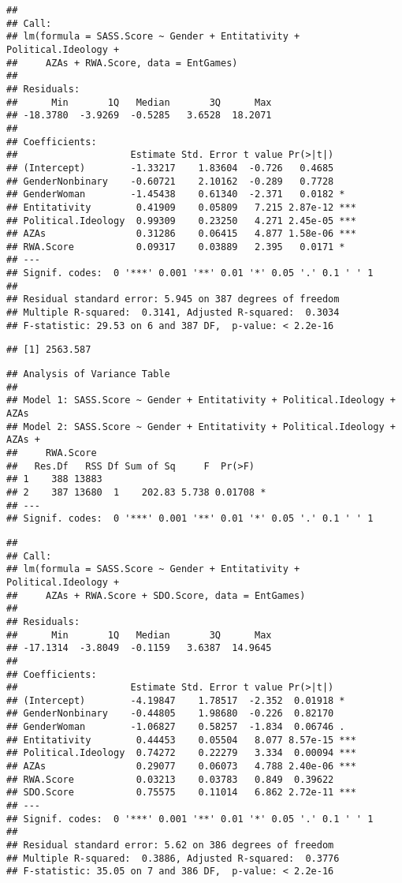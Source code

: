 \documentclass[
  doc,draftall]{apa6}
\begin{document}
\begin{verbatim}
## 
## Call:
## lm(formula = SASS.Score ~ Gender + Entitativity + Political.Ideology + 
##     AZAs + RWA.Score, data = EntGames)
## 
## Residuals:
##      Min       1Q   Median       3Q      Max 
## -18.3780  -3.9269  -0.5285   3.6528  18.2071 
## 
## Coefficients:
##                    Estimate Std. Error t value Pr(>|t|)    
## (Intercept)        -1.33217    1.83604  -0.726   0.4685    
## GenderNonbinary    -0.60721    2.10162  -0.289   0.7728    
## GenderWoman        -1.45438    0.61340  -2.371   0.0182 *  
## Entitativity        0.41909    0.05809   7.215 2.87e-12 ***
## Political.Ideology  0.99309    0.23250   4.271 2.45e-05 ***
## AZAs                0.31286    0.06415   4.877 1.58e-06 ***
## RWA.Score           0.09317    0.03889   2.395   0.0171 *  
## ---
## Signif. codes:  0 '***' 0.001 '**' 0.01 '*' 0.05 '.' 0.1 ' ' 1
## 
## Residual standard error: 5.945 on 387 degrees of freedom
## Multiple R-squared:  0.3141, Adjusted R-squared:  0.3034 
## F-statistic: 29.53 on 6 and 387 DF,  p-value: < 2.2e-16
\end{verbatim}

\begin{verbatim}
## [1] 2563.587
\end{verbatim}

\begin{verbatim}
## Analysis of Variance Table
## 
## Model 1: SASS.Score ~ Gender + Entitativity + Political.Ideology + AZAs
## Model 2: SASS.Score ~ Gender + Entitativity + Political.Ideology + AZAs + 
##     RWA.Score
##   Res.Df   RSS Df Sum of Sq     F  Pr(>F)  
## 1    388 13883                             
## 2    387 13680  1    202.83 5.738 0.01708 *
## ---
## Signif. codes:  0 '***' 0.001 '**' 0.01 '*' 0.05 '.' 0.1 ' ' 1
\end{verbatim}

\begin{verbatim}
## 
## Call:
## lm(formula = SASS.Score ~ Gender + Entitativity + Political.Ideology + 
##     AZAs + RWA.Score + SDO.Score, data = EntGames)
## 
## Residuals:
##      Min       1Q   Median       3Q      Max 
## -17.1314  -3.8049  -0.1159   3.6387  14.9645 
## 
## Coefficients:
##                    Estimate Std. Error t value Pr(>|t|)    
## (Intercept)        -4.19847    1.78517  -2.352  0.01918 *  
## GenderNonbinary    -0.44805    1.98680  -0.226  0.82170    
## GenderWoman        -1.06827    0.58257  -1.834  0.06746 .  
## Entitativity        0.44453    0.05504   8.077 8.57e-15 ***
## Political.Ideology  0.74272    0.22279   3.334  0.00094 ***
## AZAs                0.29077    0.06073   4.788 2.40e-06 ***
## RWA.Score           0.03213    0.03783   0.849  0.39622    
## SDO.Score           0.75575    0.11014   6.862 2.72e-11 ***
## ---
## Signif. codes:  0 '***' 0.001 '**' 0.01 '*' 0.05 '.' 0.1 ' ' 1
## 
## Residual standard error: 5.62 on 386 degrees of freedom
## Multiple R-squared:  0.3886, Adjusted R-squared:  0.3776 
## F-statistic: 35.05 on 7 and 386 DF,  p-value: < 2.2e-16
\end{verbatim}
\end{document}
